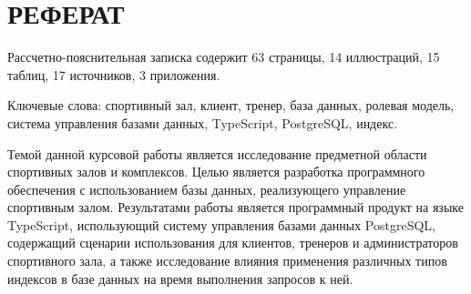 \chapter*{РЕФЕРАТ}

Рассчетно-пояснительная записка содержит 63 страницы, 14 иллюстраций, 15 таблиц, 17 источников, 3 приложения.

Ключевые слова: спортивный зал, клиент, тренер, база данных, ролевая модель, система управления базами данных, 
TypeScript, PostgreSQL, индекс.

Темой данной курсовой работы является исследование предметной области спортивных залов и комплексов.
Целью является разработка программного обеспечения с использованием базы данных, 
реализующего управление спортивным залом.
Результатами работы является программный продукт на языке TypeScript, использующий систему управления
базами данных PostgreSQL, содержащий сценарии использования для клиентов, тренеров
и администраторов спортивного зала, а также исследование влияния применения различных типов индексов в базе
данных на время выполнения запросов к ней.